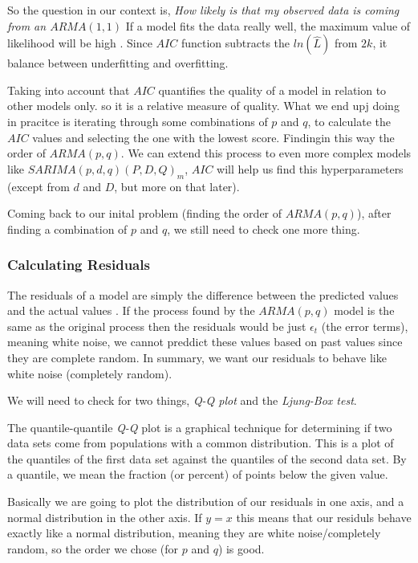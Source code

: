 \documentclass[journal]{IEEEtran}
\begin{document}
So the question in our context is, \emph{How likely is that my observed data
is coming from an $ARMA(1,1)$} If a model fits the data really well, the
maximum value of likelihood will be high \cite{timeseries}. Since $AIC$
function subtracts the $ln(\hat{L})$ from $2k$, it balance between
underfitting and overfitting.

Taking into account that $AIC$ quantifies the quality of a model in relation
to other models only.  so it is a relative measure of quality.  What we end
upj doing in pracitce is iterating through some combinations of $p$ and $q$,
to calculate the $AIC$ values and selecting the one with the lowest score.
Findingin this way the order of $ARMA(p,q)$. We can extend this process to
even more complex models like $SARIMA(p,d,q)(P,D,Q)_m$, $AIC$ will help us
find this hyperparameters (except from $d$ and $D$, but more on that later).

Coming back to our inital problem (finding the order of $ARMA(p,q)$), after
finding a combination of $p$ and $q$, we still need to check one more thing.

\subsubsection{Calculating Residuals}

The residuals of a model are simply the difference between the predicted
values and the actual values \cite{timeseries}.  If the process found by the
$ARMA(p,q)$ model is the same as the original process then the residuals would
be just $\epsilon_t$ (the error terms), meaning white noise, we cannot
preddict these values based on past values since they are complete random. In
summary, we want our residuals to behave like white noise (completely random).

We will need to check for two things, \emph{Q-Q plot} and the \emph{Ljung-Box
test}. 

The quantile-quantile \emph{Q-Q} plot is a graphical technique for determining
if two data sets come from populations with a common distribution.  This is a
plot of the quantiles of the first data set against the quantiles of the
second data set. By a quantile, we mean the fraction (or percent) of points
below the given value. \cite{qq}

Basically we are going to plot the distribution of our residuals in one axis,
and a normal distribution in the other axis. If $y=x$ this means that our
residuls behave exactly like a normal distribution, meaning they are white
noise/completely random, so the order we chose (for $p$ and $q$) is good.
\end{document}
